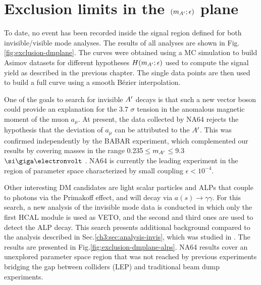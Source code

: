 
\section{Exclusion limits in the $(m_{A'};\epsilon)$ plane}
\label{ch4:sec:exclusion-limits}

To date, no event has been recorded inside the signal region defined for both invisible/visible mode analyses. The results of all analyses are shown in Fig.\ref{fig:exclusion-dmplane}. The curves were obtained using a MC simulation to build Asimov datasets for different hypotheses $H(m_{A'};\epsilon)$ used to compute the signal yield as described in the previous chapter. The single data points are then used to build a full curve using a smooth Bézier interpolation.

One of the goals to search for invisible $A'$ decays is that such a new vector boson could provide an explanation for the 3.7 $\sigma$ tension in the anomalous magnetic moment of the muon $a_{\mu}$. At present, the data collected by NA64 rejects the hypothesis that the deviation of $a_{\mu}$ can be attributed to the $A'$. This was confirmed independently by the BABAR experiment, which complemented our results by covering masses in the range 0.235$\leq$$m_{A'}$$\leq$9.3 $\gev$ \cite{PhysRevLett.119.131804}. NA64 is currently the leading experiment in the region of parameter space characterized by small coupling $\epsilon < 10^{-4}$.

Other interesting DM candidates are light scalar particles and ALPs that couple to photons via the Primakoff effect, and will decay via $a(s) \to \gamma \gamma$. For this search, a new analysis of the invisible mode data is conducted in which only the first HCAL module is used as VETO, and the second and third ones are used to detect the ALP decay. This search presents additional background compared to the analysis described in Sec.\ref{ch3:sec:analysis-invis}, which was studied in \cite{Banerjee:2020fue}. The results are presented in Fig.\ref{fig:exclusion-dmplane-alps}. NA64 results cover an unexplored parameter space region that was not reached by previous experiments bridging the gap between colliders (LEP) and traditional beam dump experiments.

